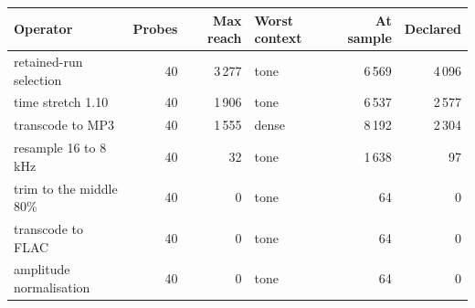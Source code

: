 \begin{tabular}{lrrlrr}
\toprule
Operator & Probes & Max reach & Worst context & At sample & Declared \\
\midrule
retained-run selection & 40 & 3\,277 & tone & 6\,569 & 4\,096 \\
time stretch 1.10 & 40 & 1\,906 & tone & 6\,537 & 2\,577 \\
transcode to MP3 & 40 & 1\,555 & dense & 8\,192 & 2\,304 \\
resample 16 to 8 kHz & 40 & 32 & tone & 1\,638 & 97 \\
trim to the middle 80\% & 40 & 0 & tone & 64 & 0 \\
transcode to FLAC & 40 & 0 & tone & 64 & 0 \\
amplitude normalisation & 40 & 0 & tone & 64 & 0 \\
\bottomrule
\end{tabular}
